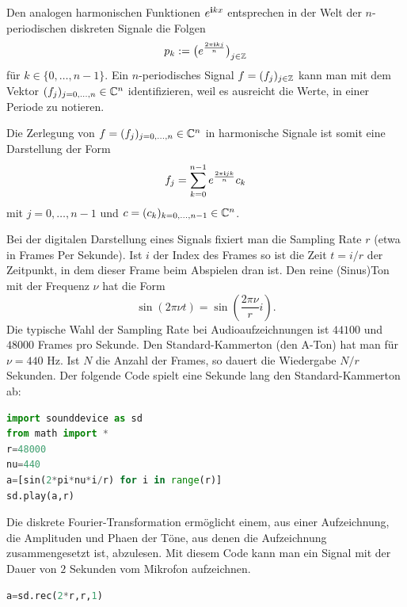 \begin{bem}
	Den analogen harmonischen Funktionen $e^{\mathbf{i} k x}$ entsprechen in der Welt der $n$-periodischen diskreten Signale die Folgen
	\[
		p_k := \bigl( e^{\frac{2 \pi \mathbf{i} k j}{n}} \bigr)_{j \in \mathbb{Z}}
	\]
	für $k \in \{0,\ldots,n-1\}$. Ein $n$-periodisches Signal $f = (f_j)_{j \in \mathbb{Z}}$ kann man mit dem Vektor $(f_j)_{j=0,\ldots,n} \in \mathbb{C}^n$ identifizieren, weil es ausreicht die Werte, in einer Periode zu notieren. 
	
	Die Zerlegung von $f = (f_j)_{j=0,\ldots,n} \in \mathbb{C}^n$ in harmonische Signale ist somit eine Darstellung der Form 
	\begin{equation}
	\label{diskrete:fourier:reihe}
	f_j = \sum_{k=0}^{n-1} e^{\frac{2 \pi \mathbf{i} j k}{n}} c_k 
	\end{equation}
	mit $j=0,\ldots,n-1$ und $c=(c_k)_{k=0,\ldots,n-1} \in \mathbb{C}^n$. 
\end{bem}

\begin{bem}
	Bei der digitalen Darstellung eines Signals fixiert man die Sampling Rate $r$ (etwa in Frames Per Sekunde). Ist $i$ der Index des Frames so ist die Zeit $t = i / r$ der Zeitpunkt, in dem dieser Frame beim Abspielen dran ist. Den reine (Sinus)Ton mit der Frequenz $\nu$ hat die Form 
	\[
			\sin ( 2\pi \nu   t) = \sin ( \frac{2 \pi \nu}{r} i).  
	\]
	Die typische Wahl der Sampling Rate bei Audioaufzeichnungen ist $44100$ und $48000$ Frames pro Sekunde. 
	Den Standard-Kammerton (den A-Ton) hat man für $\nu = 440$ Hz. Ist $N$ die Anzahl der Frames, so dauert die Wiedergabe $N/ r$ Sekunden. Der folgende Code spielt eine Sekunde lang den Standard-Kammerton ab: 
\begin{lstlisting}[language=Python]
import sounddevice as sd
from math import * 
r=48000
nu=440
a=[sin(2*pi*nu*i/r) for i in range(r)]
sd.play(a,r)
\end{lstlisting}
Die diskrete Fourier-Transformation ermöglicht einem, aus einer Aufzeichnung, die Amplituden und Phaen der Töne, aus denen die Aufzeichnung zusammengesetzt ist,  abzulesen. Mit diesem Code kann man ein Signal mit der Dauer von $2$ Sekunden vom Mikrofon aufzeichnen. 
\begin{lstlisting}[language=Python]
a=sd.rec(2*r,r,1)
\end{lstlisting}
\end{bem} 

